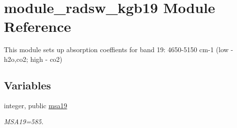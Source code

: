 \hypertarget{namespacemodule__radsw__kgb19}{}\section{module\+\_\+radsw\+\_\+kgb19 Module Reference}
\label{namespacemodule__radsw__kgb19}


This module sets up absorption coeffients for band 19\+: 4650-\/5150 cm-\/1 (low -\/ h2o,co2; high -\/ co2)  


\subsection*{Variables}
\begin{DoxyCompactItemize}
\item 
\mbox{\label{namespacemodule__radsw__kgb19_a498993cce64baa8f22c8dfdce632cf85}} 
integer, public \hyperlink{namespacemodule__radsw__kgb19_a498993cce64baa8f22c8dfdce632cf85}{msa19}
\begin{DoxyCompactList}\small\item\em M\+S\+A19=585. \end{DoxyCompactList}\end{DoxyCompactItemize}
